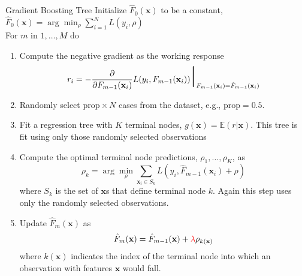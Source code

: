 \documentclass{beamer}
\begin{document}
\begin{frame}{Gradient Boosting Tree}
\footnotesize
Initialize $\hat F_0(\mathbf{x})$ to be a constant, $\hat F_0(\mathbf{x}) = \arg \min_{\rho} \sum_{i=1}^N L(y_i,\rho)$ \\
For $m$ in $1,\ldots,M$ do
\begin{enumerate}\footnotesize
\item Compute the negative gradient as the working response
    \begin{equation}
    r_i = -\frac{\partial}{\partial F_{m-1}(\mathbf{x}_i)} L(y_i,F_{m-1}(\mathbf{x}_i)) \mbox{\Huge $|$}_{F_{m-1}(\mathbf{x}_i)=\hat F_{m-1}(\mathbf{x}_i)}
    \end{equation}
\item Randomly select $\mathrm{prop}\times N$ cases from the dataset, e.g., $\mathrm{prop} = 0.5$.
\item Fit a regression tree with $K$ terminal nodes, $g(\mathbf{x})=\mathbb{E}(r|\mathbf{x})$. This tree is fit using only those randomly selected observations
\item Compute the optimal terminal node predictions, $\rho_1,\dots,\rho_K$, as
    \begin{equation}
    \rho_k = \arg \min_{\rho} \sum_{\mathbf{x}_i\in S_k} L(y_i,\hat F_{m-1}(\mathbf{x}_i)+\rho)
    \end{equation}
where $S_k$ is the set of $\mathbf{x}$s that define terminal node $k$. Again this step uses only the randomly selected observations.
\item Update $\hat F_{m}(\mathbf{x})$ as
    \begin{equation}
    \hat F_m(\mathbf{x}) = \hat F_{m-1}(\mathbf{x}) + {\color{red}{\lambda}} \rho_{k(\mathbf{x})}
    \end{equation}
where $k(\mathbf{x})$ indicates the index of the terminal node into which an observation with features $\mathbf{x}$ would fall.
\end{enumerate}
\end{frame}
\end{document}
